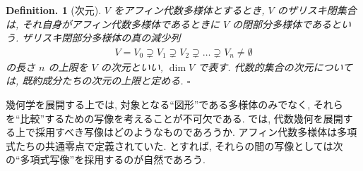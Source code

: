 \documentclass[openany, a4paper, oneside]{jsbook}
\theoremstyle{break}
\theoremstyle{breakdefn}
\newtheorem{defn}[thm]{Definition.}
\newcommand{\fin}{\hfill $\square$ \par}
\begin{document}
\begin{defn}[次元]
$V$ をアフィン代数多様体とするとき,
$V$ のザリスキ閉集合は, それ自身がアフィン代数多様体であるときに $V$ の閉部分多様体であるという.
ザリスキ閉部分多様体の真の減少列
\begin{align}
 V
 =
 V_0
 \supsetneq
 V_1
 \supsetneq
 V_2
 \supsetneq
 \dots
 \supsetneq
 V_n
 \neq
 \emptyset
\end{align}
の長さ $n$ の上限を $V$ の次元といい, $\dim V $ で表す.
代数的集合の次元については, 既約成分たちの次元の上限と定める. \fin
\end{defn}

幾何学を展開する上では, 対象となる``図形''である多様体のみでなく,
それらを``比較''するための写像を考えることが不可欠である.
では, 代数幾何を展開する上で採用すべき写像はどのようなものであろうか.
アフィン代数多様体は多項式たちの共通零点で定義されていた.
とすれば, それらの間の写像としては次の``多項式写像''を採用するのが自然であろう.
\end{document}
